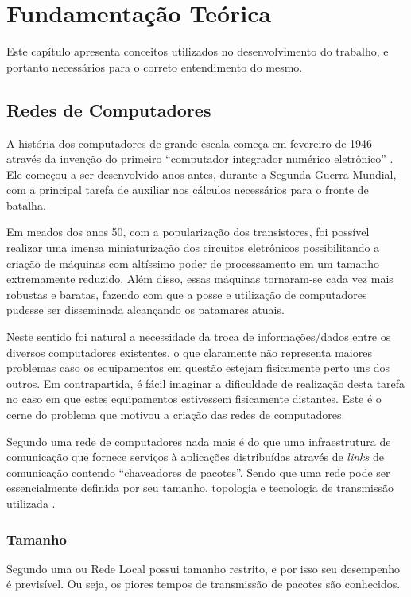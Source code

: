 \chapter{Fundamentação Teórica}
Este capítulo apresenta conceitos utilizados no desenvolvimento do trabalho, e portanto necessários para o correto entendimento do mesmo.

\section{Redes de Computadores}
A história dos computadores de grande escala começa em fevereiro de 1946 através da invenção do primeiro ``computador integrador numérico eletrônico''  \cite{Book-Jean2013}. Ele começou a ser desenvolvido anos antes, durante a Segunda Guerra Mundial, com a principal tarefa de auxiliar nos cálculos necessários para o fronte de batalha.

Em meados dos anos 50, com a popularização dos transistores, foi possível realizar uma imensa miniaturização dos circuitos eletrônicos possibilitando a criação de máquinas com altíssimo poder de processamento em um tamanho extremamente reduzido. Além disso, essas máquinas tornaram-se cada vez mais robustas e baratas, fazendo com que a posse e utilização de computadores pudesse ser disseminada alcançando os patamares atuais.

Neste sentido foi natural a necessidade da troca de informações/dados entre os diversos computadores existentes, o que claramente não representa maiores problemas caso os equipamentos em questão estejam fisicamente perto uns dos outros. Em contrapartida, é fácil imaginar a dificuldade de realização desta tarefa no caso em que estes equipamentos estivessem fisicamente distantes. Este é o cerne do problema que motivou a criação das redes de computadores.

Segundo \cite{Book-Kurose2013} uma rede de computadores nada mais é do que uma infraestrutura de comunicação que fornece serviços à aplicações distribuídas através de \emph{links} de comunicação contendo ``chaveadores de pacotes''. Sendo que uma rede pode ser essencialmente definida por seu tamanho, topologia e tecnologia de transmissão utilizada \cite{Book-Tanenbaum2003}. 

\subsection{Tamanho}
Segundo \cite{Book-Tanenbaum2003} uma  ou Rede Local possui tamanho restrito, e por isso seu desempenho é previsível. Ou seja, os piores tempos de transmissão de pacotes são conhecidos. 

